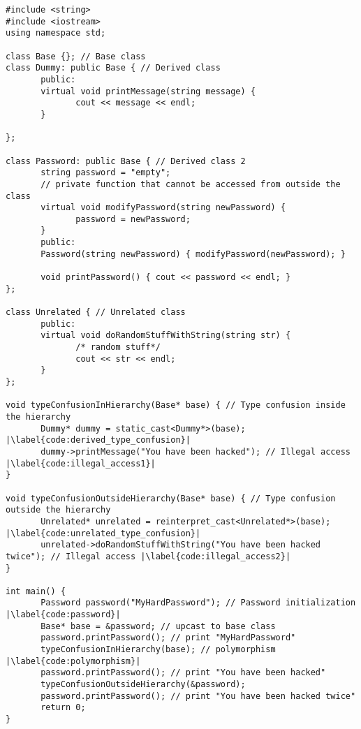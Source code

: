 \documentclass[a4paper,11pt,oneside]{report}
\begin{document}
\begin{listing}
       \begin{verbatim}
#include <string>
#include <iostream>
using namespace std;

class Base {}; // Base class
class Dummy: public Base { // Derived class
       public:
       virtual void printMessage(string message) {
              cout << message << endl;
       }
       
};

class Password: public Base { // Derived class 2
       string password = "empty";
       // private function that cannot be accessed from outside the class
       virtual void modifyPassword(string newPassword) {
              password = newPassword;
       }
       public:
       Password(string newPassword) { modifyPassword(newPassword); }

       void printPassword() { cout << password << endl; }
};

class Unrelated { // Unrelated class
       public: 
       virtual void doRandomStuffWithString(string str) {
              /* random stuff*/
              cout << str << endl;
       }
};

void typeConfusionInHierarchy(Base* base) { // Type confusion inside the hierarchy
       Dummy* dummy = static_cast<Dummy*>(base); |\label{code:derived_type_confusion}|
       dummy->printMessage("You have been hacked"); // Illegal access |\label{code:illegal_access1}|
}

void typeConfusionOutsideHierarchy(Base* base) { // Type confusion outside the hierarchy
       Unrelated* unrelated = reinterpret_cast<Unrelated*>(base); |\label{code:unrelated_type_confusion}|
       unrelated->doRandomStuffWithString("You have been hacked twice"); // Illegal access |\label{code:illegal_access2}|
}

int main() {
       Password password("MyHardPassword"); // Password initialization |\label{code:password}|
       Base* base = &password; // upcast to base class
       password.printPassword(); // print "MyHardPassword"
       typeConfusionInHierarchy(base); // polymorphism |\label{code:polymorphism}|
       password.printPassword(); // print "You have been hacked"
       typeConfusionOutsideHierarchy(&password);
       password.printPassword(); // print "You have been hacked twice"
       return 0;
}
       \end{verbatim}
       \caption{Example of type confusion in C++ within the same class hierarchy.}
       \label{lst:type_confusion}
\end{listing}
\end{document}
